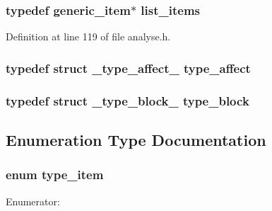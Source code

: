 \subsubsection[{list\_\-items}]{\setlength{\rightskip}{0pt plus 5cm}typedef {\bf generic\_\-item}$\ast$ {\bf list\_\-items}}\label{analyse_8h_17fdb2898389e98566802871743b4932}




Definition at line 119 of file analyse.h.
\subsubsection[{type\_\-affect}]{\setlength{\rightskip}{0pt plus 5cm}typedef struct {\bf \_\-type\_\-affect\_\-}  {\bf type\_\-affect}}\label{analyse_8h_b1cc58eda540d0cc169e48c42898c210}


\subsubsection[{type\_\-block}]{\setlength{\rightskip}{0pt plus 5cm}typedef struct {\bf \_\-type\_\-block\_\-}  {\bf type\_\-block}}\label{analyse_8h_72489d637b7dbe95c78d1439a7b317e2}




\subsection{Enumeration Type Documentation}
\subsubsection[{type\_\-item}]{\setlength{\rightskip}{0pt plus 5cm}enum {\bf type\_\-item}}\label{analyse_8h_6f3f9bfbd10818ff5891c0f505f79613}


\begin{Desc}
\item[Enumerator: ]\par
\begin{description}
\item[{\em 
TYPE\_\-BLOCK\label{analyse_8h_6f3f9bfbd10818ff5891c0f505f79613bd5d7984039c921fb93343162a574853}
}]\item[{\em 
TYPE\_\-AFFECT\label{analyse_8h_6f3f9bfbd10818ff5891c0f505f796139ad7ba0457adc1e31ac27dc2f00311f7}
}]\end{description}
\end{Desc}



